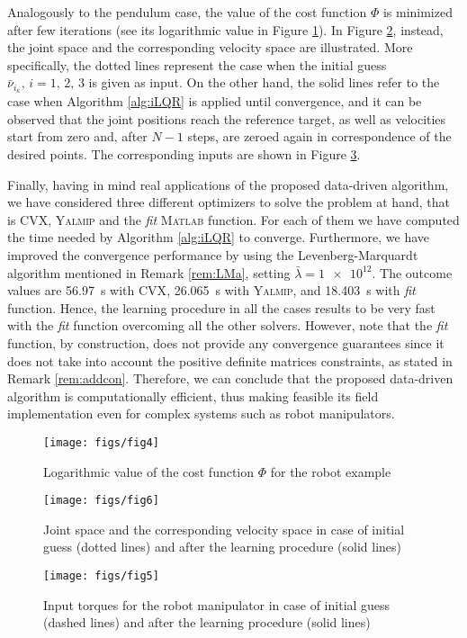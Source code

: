 \documentclass[10pt]{IEEEtran}      %
\theoremstyle{theorem}
\theoremstyle{remark}
\begin{document}
Analogously to the pendulum case, the value of the cost function $\Phi$ is minimized after few iterations (see its logarithmic value in Figure \ref{fig:cost_comau}). In Figure \ref{fig:result_comau2}, instead, the joint space and the corresponding velocity space are illustrated. More specifically, the dotted lines represent the case when the initial guess $\bar{\nu}_{i_\kappa},\,i=1,\,2,\,3$ is given as input. On the other hand, the solid lines refer to the case when Algorithm  \ref{alg:iLQR} is applied until convergence, and it can be observed that the joint  positions reach the reference target, as well as velocities start from zero and, after $N-1$ steps, are zeroed again in correspondence of the desired points. The corresponding inputs are shown in Figure \ref{fig:result_comau1}.

Finally, having in mind real applications of the proposed data-driven algorithm, we have considered three different optimizers to solve the problem at hand, that is \textsc{CVX}, \textsc{Yalmip} and the \emph{fit} \textsc{Matlab} function. For each of them we have computed the time needed by Algorithm \ref{alg:iLQR} to converge. Furthermore, we have improved the convergence performance by using the Levenberg-Marquardt algorithm mentioned in Remark \ref{rem:LMa}, setting $\bar{\lambda}=\num{1e12}$. The outcome values are \SI{56.97}{\second} with \textsc{CVX}, \SI{26.065}{\second} with \textsc{Yalmip}, and \SI{18.403}{\second} with \emph{fit} function. Hence, the learning procedure in all the cases results to be very fast with the \emph{fit} function overcoming all the other solvers. However, note that the \emph{fit} function, by construction, does not provide any convergence guarantees since it does not take into account the positive definite matrices constraints, as stated in Remark \ref{rem:addcon}. Therefore, we can conclude that the proposed data-driven algorithm is computationally efficient, thus making feasible its field implementation even for complex systems such as robot manipulators.
\begin{figure}[htb!]
\center
\texttt{[image: figs/fig4]}
\caption{Logarithmic value of the cost function $\Phi$ for the robot example}
\label{fig:cost_comau}
\end{figure}
\begin{figure}[htb!]
\center
\texttt{[image: figs/fig6]}
\caption{Joint space and the corresponding velocity space in case of initial guess (dotted lines) and after the learning procedure (solid lines)}
\label{fig:result_comau2}
\end{figure}
\begin{figure}[htb!]
\center
\texttt{[image: figs/fig5]}
\caption{Input torques for the robot manipulator in case of initial guess (dashed lines) and after the learning procedure (solid lines)}
\label{fig:result_comau1}
\end{figure}
\end{document}
